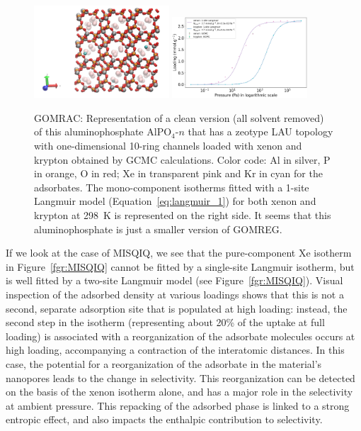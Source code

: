 \documentclass[main.tex]{subfiles}
\begin{document}
\begin{figure}[h]
  \centering
    \includegraphics[width=0.45\textwidth]{figures/2-thermo/GOMRAC_clean.jpg}
    \includegraphics[width=0.45\textwidth]{figures/2-thermo/GOMRAC_clean_isotherm_xenon_krypton_298K.jpg}
    \caption{GOMRAC: Representation of a clean version (all solvent removed) of this aluminophosphate AlPO$_4$-$n$ that has a zeotype LAU topology with one-dimensional 10-ring channels loaded with xenon and krypton obtained by GCMC calculations. Color code: Al in silver, P in orange, O in red; Xe in transparent pink and Kr in cyan for the adsorbates. The mono-component isotherms fitted with a 1-site Langmuir model (Equation~\ref{eq:langmuir_1}) for both xenon and krypton at \SI{298}{\kelvin} is represented on the right side. It seems that this aluminophosphate is just a smaller version of GOMREG.}\label{fgr:SI:examples:GOMRAC}
  \end{figure}

If we look at the case of MISQIQ, we see that the pure-component Xe isotherm in Figure~\ref{fgr:MISQIQ} cannot be fitted by a single-site Langmuir isotherm, but is well fitted by a two-site Langmuir model (see Figure~\ref{fgr:MISQIQ}). Visual inspection of the adsorbed density at various loadings shows that this is not a second, separate adsorption site that is populated at high loading: instead, the second step in the isotherm (representing about {20\%} of the uptake at full loading) is associated with a reorganization of the adsorbate molecules occurs at high loading, accompanying a contraction of the interatomic distances. In this case, the potential for a reorganization of the adsorbate in the material's nanopores leads to the change in selectivity. This reorganization can be detected on the basis of the xenon isotherm alone, and has a major role in the selectivity at ambient pressure. This repacking of the adsorbed phase is linked to a strong entropic effect, and also impacts the enthalpic contribution to selectivity.
\end{document}
